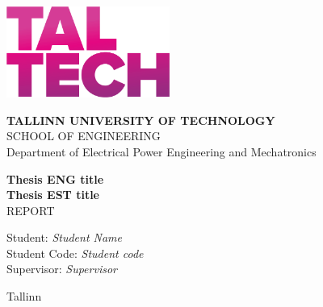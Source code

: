 \begin{titlepage}

    
    \newcommand{\thesisTitle}{
        Thesis ENG title
    }
    
    \newcommand{\thesisTitleEST}{Thesis EST title}
    
    \begin{flushleft}
        \includegraphics[width=0.4\textwidth]{dependancies/TTU_logo_fixed2.png}
    
    
        \textcolor{TTUgray}{
            \textbf{TALLINN UNIVERSITY OF TECHNOLOGY} \\
            SCHOOL OF ENGINEERING \\
            Department of Electrical Power Engineering and Mechatronics}
    \end{flushleft}
    
    
        \begin{center}
            
    
            \vspace*{4cm}
            
            {
                { \textbf{\thesisTitle}} \\
                \vspace*{0.5cm}
                { \textbf{\thesisTitleEST}} \\
                \vspace*{0.7cm}
                { REPORT}
            }
    
            \vspace{1.5cm}
    
            \begin{flushright}
                Student: {\it Student Name} \\
                Student Code: {\it Student code} \\
                Supervisor: {\it Supervisor}
            \end{flushright}
    
            \vspace*{5cm}
    
            Tallinn \the\year{}
    
        \end{center}
    \end{titlepage}